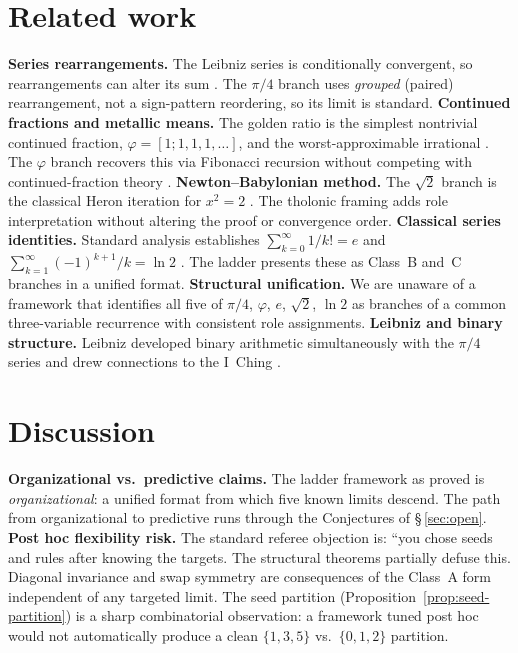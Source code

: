 \documentclass[12pt]{article}
\theoremstyle{definition}
\theoremstyle{remark}
\begin{document}
\section{Related work}\label{sec:related}
\textbf{Series rearrangements.} The Leibniz series is conditionally convergent, so
rearrangements can alter its sum \cite{Kno56}. The $\pi/4$ branch uses \emph{grouped}
(paired) rearrangement, not a sign-pattern reordering, so its limit is standard.
\textbf{Continued fractions and metallic means.} The golden ratio is the simplest nontrivial
continued fraction, $\varphi = [1;1,1,1,\ldots]$, and the worst-approximable irrational
\cite{HW79}. The $\varphi$ branch recovers this via Fibonacci recursion without competing
with continued-fraction theory \cite{Kos01}.
\textbf{Newton--Babylonian method.} The $\sqrt{2}$ branch is the classical Heron iteration
for $x^2 = 2$ \cite{Hea21,BF15}. The tholonic framing adds role interpretation without
altering the proof or convergence order.
\textbf{Classical series identities.} Standard analysis establishes $\sum_{k=0}^\infty 1/k! = e$
\cite{Rud76} and $\sum_{k=1}^\infty (-1)^{k+1}/k = \ln 2$ \cite{Kno56}. The ladder presents
these as Class~B and~C branches in a unified format.
\textbf{Structural unification.} We are unaware of a framework that identifies all five of
$\pi/4$, $\varphi$, $e$, $\sqrt{2}$, $\ln 2$ as branches of a common three-variable
recurrence with consistent role assignments.
\textbf{Leibniz and binary structure.} Leibniz developed binary arithmetic simultaneously
with the $\pi/4$ series and drew connections to the I~Ching \cite{Lei03,Swe03}.

\section{Discussion}\label{sec:discussion}
\textbf{Organizational vs.\ predictive claims.} The ladder framework as proved is
\emph{organizational}: a unified format from which five known limits descend. The path
from organizational to predictive runs through the Conjectures of \S\,\ref{sec:open}.
\textbf{Post hoc flexibility risk.} The standard referee objection is: ``you chose seeds
and rules after knowing the targets. The structural theorems partially defuse this.
Diagonal invariance and swap symmetry are consequences of the Class~A form independent of
any targeted limit. The seed partition (Proposition~\ref{prop:seed-partition}) is a sharp
combinatorial observation: a framework tuned post hoc would not automatically produce a
clean $\{1,3,5\}$ vs.\ $\{0,1,2\}$ partition.
\end{document}
